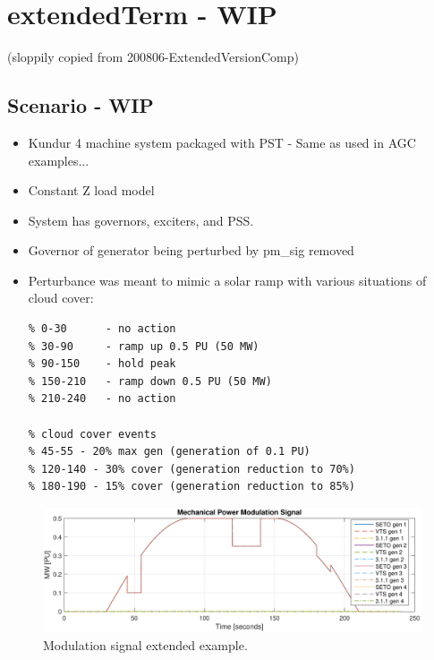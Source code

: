\section{extendedTerm - WIP}
(sloppily copied from 200806-ExtendedVersionComp)

\subsection{Scenario - WIP} 
\begin{itemize}
\footnotesize
\raggedright
\singlespacing
\itemsep 0em
\item Kundur  4 machine system packaged with PST - Same as used in AGC examples...
\item Constant Z load model
\item System has governors, exciters, and PSS.
\item Governor of generator being perturbed by pm\_sig removed
\item Perturbance was meant to mimic a solar ramp with various situations of cloud cover:\\
\begin{Verbatim}[fontsize=\scriptsize]
% time [seconds]
% 0-30      - no action
% 30-90     - ramp up 0.5 PU (50 MW)
% 90-150    - hold peak
% 150-210   - ramp down 0.5 PU (50 MW)
% 210-240   - no action

% cloud cover events
% 45-55 - 20% max gen (generation of 0.1 PU)
% 120-140 - 30% cover (generation reduction to 70%)
% 180-190 - 15% cover (generation reduction to 85%)
\end{Verbatim}
\end{itemize}


\begin{figure}[H]
	\centering
	\footnotesize
	\includegraphics[width=\linewidth]{examples/extendedTerm/extended-1}
	\caption{Modulation signal extended example.}
	\label{fig: extended 1}
\end{figure}%




